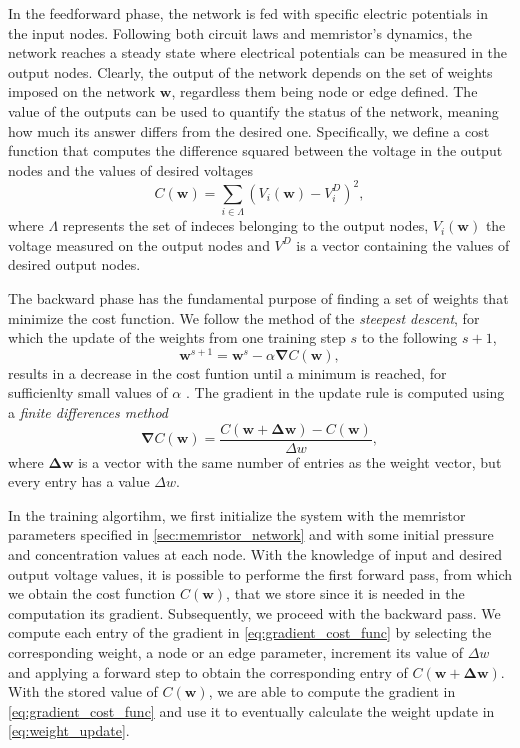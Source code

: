 \documentclass[reprint,superscriptaddress,prb,showkeys]{revtex4-2}
\newcommand{\brac}[1]{\left(#1 \right)} %
\begin{document}
In the feedforward phase, the network is fed with specific electric potentials in the input nodes. Following both circuit laws and memristor's dynamics, the network reaches a steady state where electrical potentials can be measured in the output nodes. Clearly, the output of the network depends on the set of weights imposed on the network $\boldsymbol{w}$, regardless them being node or edge defined. The value of the outputs can be used to quantify the status of the network, meaning how much its answer differs from the desired one. Specifically, we define a cost function that computes the difference squared between the voltage in the output nodes and the values of desired voltages
\[
C\left( \boldsymbol{w} \right) = \sum_{i \in \Lambda} \brac{V_i\brac{\boldsymbol{w}} - V_i^D}^2,
\label{eq:cost_func}
\]
where $\Lambda$ represents the set of indeces belonging to the output nodes, $V_i\brac{\boldsymbol{w}}$ the voltage measured on the output nodes and $V^D$ is a vector containing the values of desired output nodes.

The backward phase has the fundamental purpose of finding a set of weights that minimize the cost function. We follow the method of the \textit{steepest descent}, for which the update of the weights from one training step $s$ to the following $s+1$,
\begin{equation}
\boldsymbol{w}^{s+1} = \boldsymbol{w}^{s} - \alpha \boldsymbol{\nabla}C\brac{\boldsymbol{w}},
\label{eq:weight_update}
\end{equation}
results in a decrease in the cost funtion until a minimum is reached, for sufficienlty small values of $\alpha$ \cite{steepest_descent_book}. The gradient in the update rule is computed using a \textit{finite differences method}
\begin{equation}
\boldsymbol{\nabla}C\brac{\boldsymbol{w}} = \frac{C\brac{\boldsymbol{w}+\boldsymbol{\Delta w}}-C\brac{\boldsymbol{w}}}{\Delta w},
\label{eq:gradient_cost_func}
\end{equation}
where $\boldsymbol{\Delta w}$ is a vector with the same number of entries as the weight vector, but every entry has a value $\Delta w$. 

In the training algortihm, we first initialize the system with the memristor parameters specified in \cref{sec:memristor_network} and with some initial pressure and concentration values at each node. With the knowledge of input and desired output voltage values, it is possible to performe the first forward pass, from which we obtain the cost function $C\brac{\boldsymbol{w}}$, that we store since it is needed in the computation its gradient. Subsequently, we proceed with the backward pass. We compute each entry of the gradient in \cref{eq:gradient_cost_func} by selecting the corresponding weight, a node or an edge parameter, increment its value of $\Delta w$ and applying a forward step to obtain the corresponding entry of $C\brac{\boldsymbol{w}+\boldsymbol{\Delta w}}$. With the stored value of $C\brac{\boldsymbol{w}}$, we are able to compute the gradient in \cref{eq:gradient_cost_func} and use it to eventually calculate the weight update in \cref{eq:weight_update}.
\end{document}
